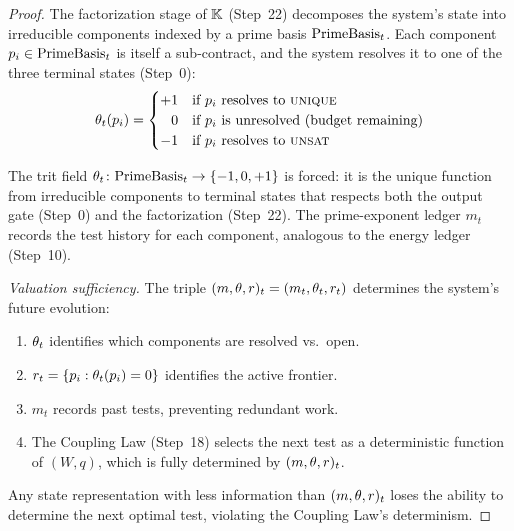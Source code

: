 \begin{proof}
The factorization stage of $\mathbb{K}$ (Step~22) decomposes the system's
state into irreducible components indexed by a prime basis
$\mathrm{PrimeBasis}_t$.  Each component $p_i \in \mathrm{PrimeBasis}_t$ is itself a
sub-contract, and the system resolves it to one of the three terminal
states (Step~0):
\[
  \theta_t(p_i) =
  \begin{cases}
    +1 & \text{if } p_i \text{ resolves to } \textsc{unique} \\
    \phantom{+}0 & \text{if } p_i \text{ is unresolved (budget remaining)} \\
    -1 & \text{if } p_i \text{ resolves to } \textsc{unsat}
  \end{cases}
\]

The trit field $\theta_t \colon \mathrm{PrimeBasis}_t \to \{-1, 0, +1\}$ is
forced: it is the unique function from irreducible components to terminal
states that respects both the output gate (Step~0) and the factorization
(Step~22).  The prime-exponent ledger $m_t$ records the test history for
each component, analogous to the energy ledger (Step~10).

\emph{Valuation sufficiency.} The triple $(m, \theta, r)_t = (m_t,
\theta_t, r_t)$ determines the system's future evolution:
\begin{enumerate}[nosep]
  \item $\theta_t$ identifies which components are resolved vs.\ open.
  \item $r_t = \{p_i : \theta_t(p_i) = 0\}$ identifies the
        active frontier.
  \item $m_t$ records past tests, preventing redundant work.
  \item The Coupling Law (Step~18) selects the next test as a deterministic
        function of $(W, q)$, which is fully determined by $(m, \theta, r)_t$.
\end{enumerate}
Any state representation with less information than $(m, \theta, r)_t$ loses
the ability to determine the next optimal test, violating the Coupling
Law's determinism.

\end{proof}


